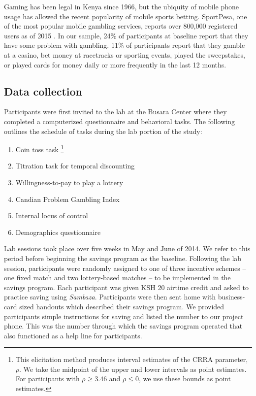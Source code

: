 \documentclass[12pt]{article}
\begin{document}
		Gaming has been legal in Kenya since 1966, but the ubiquity of mobile phone usage has allowed the recent popularity of mobile sports betting. SportPesa, one of the most popular mobile gambling services, reports over 800,000 registered users as of 2015 . In our sample, 24\% of participants at baseline report that they have some problem with gambling. 11\% of participants report that they gamble at a casino, bet money at racetracks or sporting events, played the sweepstakes, or played cards for money daily or more frequently in the last 12 months.

	\subsection{Data collection}

		Participants were first invited to the lab at the Busara Center where they completed a computerized questionnaire and behavioral tasks. The following outlines the schedule of tasks during the lab portion of the study:

		\begin{enumerate}
		\item Coin toss task \footnote{This elicitation method produces interval estimates of the CRRA parameter, $\rho$. We take the midpoint of the upper and lower intervals as point estimates. For participants with $\rho \geq 3.46$ and $\rho \leq 0$, we use these bounds as point estimates.}
		\item Titration task for temporal discounting 
		\item Willingness-to-pay to play a lottery
		\item Candian Problem Gambling Index 
		\item Internal locus of control 
		\item Demographics questionnaire
		\end{enumerate}

		Lab sessions took place over five weeks in May and June of 2014. We refer to this period before beginning the savings program as the baseline. Following the lab session, participants were randomly assigned to one of three incentive schemes -- one fixed match and two lottery-based matches -- to be implemented in the savings program. Each participant was given KSH 20 airtime credit and asked to practice saving using \textit{Sambaza}. Participants were then sent home with business-card sized handouts which described their savings program. We provided participants simple instructions for saving and listed the number to our project phone. This was the number through which the savings program operated that also functioned as a help line for participants.
\end{document}
